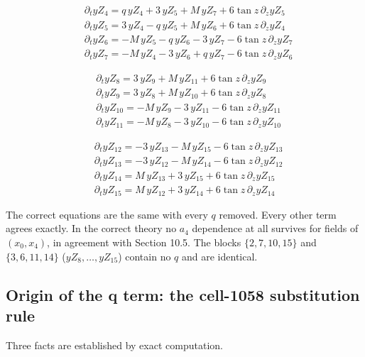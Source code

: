\documentclass[11pt]{article}
\begin{document}
\[
\begin{aligned}
&\partial_t yZ_{4}=q\,yZ_{4}+3\,yZ_{5}+M\,yZ_{7}+6\tan z\,\partial_z yZ_{5} \\
&\partial_t yZ_{5}=3\,yZ_{4}-q\,yZ_{5}+M\,yZ_{6}+6\tan z\,\partial_z yZ_{4} \\
&\partial_t yZ_{6}=-M\,yZ_{5}-q\,yZ_{6}-3\,yZ_{7}-6\tan z\,\partial_z yZ_{7} \\
&\partial_t yZ_{7}=-M\,yZ_{4}-3\,yZ_{6}+q\,yZ_{7}-6\tan z\,\partial_z yZ_{6}
\end{aligned}\tag{stored, block 1,4,9,12}
\]

\[
\begin{aligned}
&\partial_t yZ_{8}=3\,yZ_{9}+M\,yZ_{11}+6\tan z\,\partial_z yZ_{9} \\
&\partial_t yZ_{9}=3\,yZ_{8}+M\,yZ_{10}+6\tan z\,\partial_z yZ_{8} \\
&\partial_t yZ_{10}=-M\,yZ_{9}-3\,yZ_{11}-6\tan z\,\partial_z yZ_{11} \\
&\partial_t yZ_{11}=-M\,yZ_{8}-3\,yZ_{10}-6\tan z\,\partial_z yZ_{10}
\end{aligned}\tag{stored, block 2,7,10,15}
\]

\[
\begin{aligned}
&\partial_t yZ_{12}=-3\,yZ_{13}-M\,yZ_{15}-6\tan z\,\partial_z yZ_{13} \\
&\partial_t yZ_{13}=-3\,yZ_{12}-M\,yZ_{14}-6\tan z\,\partial_z yZ_{12} \\
&\partial_t yZ_{14}=M\,yZ_{13}+3\,yZ_{15}+6\tan z\,\partial_z yZ_{15} \\
&\partial_t yZ_{15}=M\,yZ_{12}+3\,yZ_{14}+6\tan z\,\partial_z yZ_{14}
\end{aligned}\tag{stored, block 3,6,11,14}
\]

The correct equations are the same with every $q$ removed. Every other term agrees exactly. In the correct theory no $a_4$ dependence at all survives for fields of $(x_0,x_4)$, in agreement with Section 10.5. The blocks $\{2,7,10,15\}$ and $\{3,6,11,14\}$ ($yZ_8,\dots,yZ_{15}$) contain no $q$ and are identical.

\subsection{Origin of the q term: the cell-1058 substitution rule}

Three facts are established by exact computation.
\end{document}

